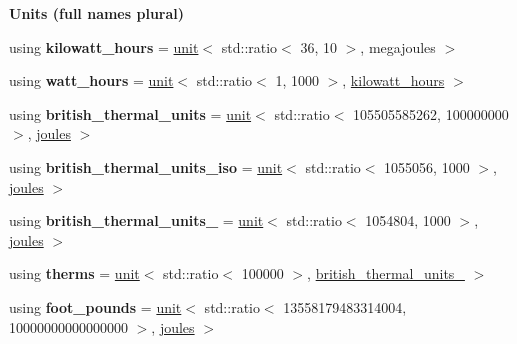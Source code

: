 \begin{Indent}{\bf Units (full names plural)}
\begin{DoxyCompactItemize}
\item 
\hypertarget{namespaceunits_1_1energy_aa8548fd6e40efcbdf76f91a5c5549c34}{}using {\bfseries kilowatt\+\_\+hours} = \hyperlink{structunits_1_1unit}{unit}$<$ std\+::ratio$<$ 36, 10 $>$, megajoules $>$\label{namespaceunits_1_1energy_aa8548fd6e40efcbdf76f91a5c5549c34}

\item 
\hypertarget{namespaceunits_1_1energy_aa1e970fbfd2b4f5a7169f77d5d6d8739}{}using {\bfseries watt\+\_\+hours} = \hyperlink{structunits_1_1unit}{unit}$<$ std\+::ratio$<$ 1, 1000 $>$, \hyperlink{structunits_1_1unit}{kilowatt\+\_\+hours} $>$\label{namespaceunits_1_1energy_aa1e970fbfd2b4f5a7169f77d5d6d8739}

\item 
\hypertarget{namespaceunits_1_1energy_a8b0dab020e7e54b94a3bc3ad60fc88c4}{}using {\bfseries british\+\_\+thermal\+\_\+units} = \hyperlink{structunits_1_1unit}{unit}$<$ std\+::ratio$<$ 105505585262, 100000000 $>$, \hyperlink{structunits_1_1unit}{joules} $>$\label{namespaceunits_1_1energy_a8b0dab020e7e54b94a3bc3ad60fc88c4}

\item 
\hypertarget{namespaceunits_1_1energy_ae1998e0818c68f72512c80ef41a07034}{}using {\bfseries british\+\_\+thermal\+\_\+units\+\_\+iso} = \hyperlink{structunits_1_1unit}{unit}$<$ std\+::ratio$<$ 1055056, 1000 $>$, \hyperlink{structunits_1_1unit}{joules} $>$\label{namespaceunits_1_1energy_ae1998e0818c68f72512c80ef41a07034}

\item 
\hypertarget{namespaceunits_1_1energy_ac6ed16182eb58a6982fec3609de4c6d5}{}using {\bfseries british\+\_\+thermal\+\_\+units\+\_} = \hyperlink{structunits_1_1unit}{unit}$<$ std\+::ratio$<$ 1054804, 1000 $>$, \hyperlink{structunits_1_1unit}{joules} $>$\label{namespaceunits_1_1energy_ac6ed16182eb58a6982fec3609de4c6d5}

\item 
\hypertarget{namespaceunits_1_1energy_a219ab54ec7887633b73a727e5d95723e}{}using {\bfseries therms} = \hyperlink{structunits_1_1unit}{unit}$<$ std\+::ratio$<$ 100000 $>$, \hyperlink{structunits_1_1unit}{british\+\_\+thermal\+\_\+units\+\_} $>$\label{namespaceunits_1_1energy_a219ab54ec7887633b73a727e5d95723e}

\item 
\hypertarget{namespaceunits_1_1energy_a7f08ea82578bf41ff79afde639088799}{}using {\bfseries foot\+\_\+pounds} = \hyperlink{structunits_1_1unit}{unit}$<$ std\+::ratio$<$ 13558179483314004, 10000000000000000 $>$, \hyperlink{structunits_1_1unit}{joules} $>$\label{namespaceunits_1_1energy_a7f08ea82578bf41ff79afde639088799}

\end{DoxyCompactItemize}
\end{Indent}
